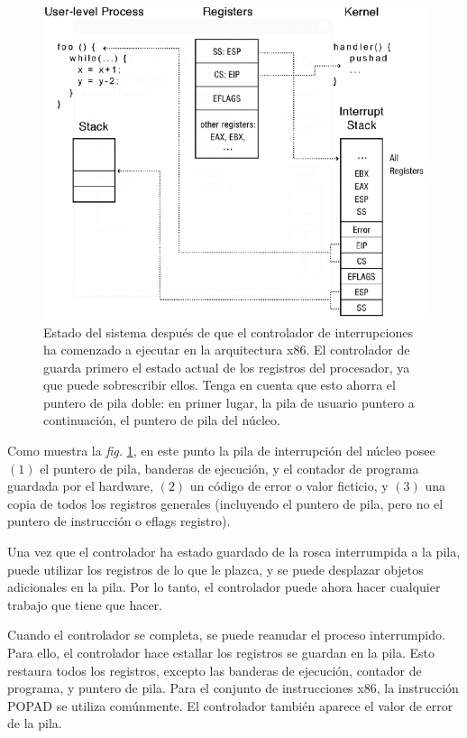 \documentclass[10pt]{book}
\begin{document}
\begin{figure}[tbhp]
\centerline{\includegraphics[scale=0.55]{img/fig0208}}
\caption{ Estado del sistema después de que el controlador de interrupciones ha comenzado a ejecutar en la arquitectura x86. El controlador de guarda primero el estado actual de los registros del procesador, ya que puede sobrescribir ellos. Tenga en cuenta que esto ahorra el puntero de pila doble: en primer lugar, la pila de usuario puntero a continuación, el puntero de pila del núcleo.}
\label{fig0208}
\end{figure}

Como muestra la \textit{fig.} \ref{fig0208}, en este punto la pila de interrupción del núcleo posee $(1)$ el puntero de pila, banderas de ejecución, y el contador de programa guardada por el hardware, $(2)$ un código de error o valor ficticio, y $(3)$ una copia de todos los registros generales (incluyendo el puntero de pila, pero no el puntero de instrucción o eflags registro).

Una vez que el controlador ha estado guardado de la rosca interrumpida a la pila, puede utilizar los registros de lo que le plazca, y se puede desplazar objetos adicionales en la pila. Por lo tanto, el controlador puede ahora hacer cualquier trabajo que tiene que hacer.

Cuando el controlador se completa, se puede reanudar el proceso interrumpido. Para ello, el controlador hace estallar los registros se guardan en la pila. Esto restaura todos los registros, excepto las banderas de ejecución, contador de programa, y puntero de pila. Para el conjunto de instrucciones x$86$, la instrucción POPAD se utiliza comúnmente. El controlador también aparece el valor de error de la pila.
\end{document}
